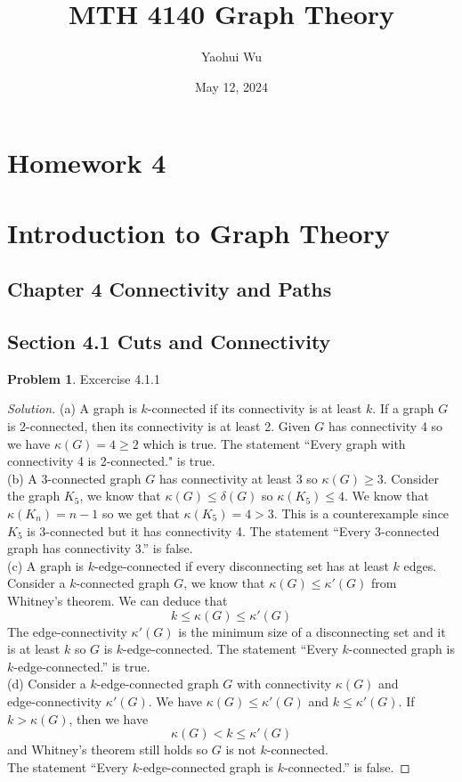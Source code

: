 \documentclass[12pt]{article}
\title{MTH 4140 Graph Theory}
\author{Yaohui Wu}
\date{May 12, 2024}
\theoremstyle{definition}
\newtheorem{problem}{Problem}
\newenvironment*{solution}{\begin{proof}[Solution]}{\end{proof}}
\begin{document}
\maketitle
\section*{Homework 4}
\section*{Introduction to Graph Theory}

\subsection*{Chapter 4 Connectivity and Paths}
\subsection*{Section 4.1 Cuts and Connectivity}
\begin{problem}
    Excercise 4.1.1
\end{problem}
\begin{solution}
    (a) A graph is \(k\)-connected if its connectivity is at least \(k\).
    If a graph \(G\) is 2-connected, then its connectivity is at least 2.
    Given \(G\) has connectivity 4 so we have \(\kappa(G)=4\geq2\) which is
    true.
    The statement ``Every graph with connectivity 4 is 2-connected." is
    true. \\
    (b) A 3-connected graph \(G\) has connectivity at least 3 so
    \(\kappa(G)\geq3\).
    Consider the graph \(K_5\), we know that \(\kappa(G)\leq\delta(G)\) so
    \(\kappa(K_5)\leq4\).
    We know that \(\kappa(K_n)=n-1\) so we get that \(\kappa(K_5)=4>3\).
    This is a counterexample since \(K_5\) is 3-connected but it has
    connectivity 4.
    The statement ``Every 3-connected graph has connectivity 3.'' is false. \\
    (c) A graph is \(k\)-edge-connected if every disconnecting set has at
    least \(k\) edges.
    Consider a \(k\)-connected graph \(G\), we know that
    \(\kappa(G)\leq\kappa'(G)\) from Whitney's theorem.
    We can deduce that \[k \leq \kappa(G) \leq \kappa'(G) \]
    The edge-connectivity \(\kappa'(G)\) is the minimum size of a
    disconnecting set and it is at least \(k\) so \(G\) is
    \(k\)-edge-connected.
    The statement ``Every \(k\)-connected graph is \(k\)-edge-connected.'' is
    true. \\
    (d) Consider a \(k\)-edge-connected graph \(G\) with connectivity
    \(\kappa(G)\) and \\ edge-connectivity \(\kappa'(G)\).
    We have \(\kappa(G)\leq\kappa'(G)\) and \(k\leq\kappa'(G)\).
    If \(k>\kappa(G)\), then we have \[\kappa(G)<k\leq\kappa'(G)\] and
    Whitney's theorem still holds so \(G\) is not \(k\)-connected. \\
    The statement ``Every \(k\)-edge-connected graph is \(k\)-connected.'' is
    false.
\end{solution}
\end{document}

